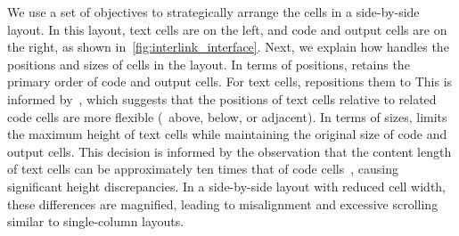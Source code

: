 


We use   a set of objectives to strategically arrange the cells in a side-by-side layout. In this layout, text cells are on the left, and code and output cells are on the right, as shown in~\autoref{fig:interlink_interface}.
Next, we explain how \tool handles the positions and sizes of cells in the layout.
In terms of positions, \tool retains the primary order of code and output cells. 
For text cells, \tool repositions them to 
This is informed by~\cite{wang2022documentation}, which suggests that the positions of text cells relative to related code cells are more flexible (\eg~above, below, or adjacent).
In terms of sizes, \tool limits the maximum height of text cells while maintaining the original size of code and output cells.
This decision is informed by the observation that the content length of text cells can be approximately ten times that of code cells~\cite{wang2022documentation}, causing significant height discrepancies. 
In a side-by-side layout with reduced cell width, these differences are magnified, leading to misalignment and excessive scrolling similar to single-column layouts.


